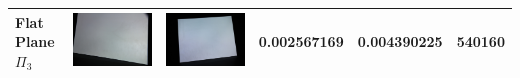 \documentclass[final,12pt,3p]{elsarticle}
\begin{document}
\begin{table}[!ht]
{\begin{tabular}{| l | >{\centering\arraybackslash} m{2.5cm} | >{\centering\arraybackslash} m{2.5cm} | c | c | c |}
   Flat Plane $\Pi_{3}$ & \includegraphics[scale=0.05]{./images/plane3_cam1.JPG} & \includegraphics[scale=0.05]{./images/plane3_cam2.JPG} & 0.002567169 & 0.004390225 & 540160\\
   \hline

\end{tabular}}
\end{table}
\end{document}
